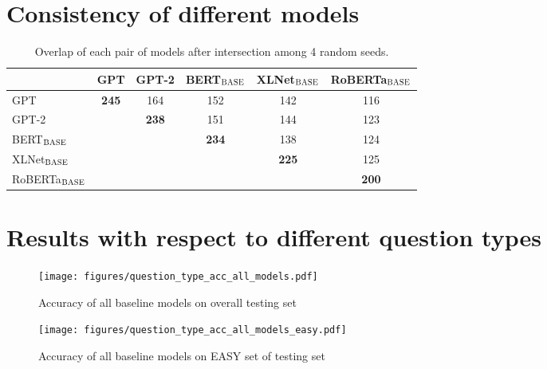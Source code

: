 \documentclass{article} \usepackage{iclr2020_conference,times}
\newcommand\bertbase{BERT$_{\small \textsc{BASE}}$\xspace}
\newcommand\xlnetbase{XLNet$_{\small \textsc{BASE}}$\xspace}
\newcommand\robertabase{RoBERTa$_{\small \textsc{BASE}}$\xspace}
\begin{document}
\section{Consistency of different models}
\label{appendix-consistency-of-different-models}
\begin{table}[ht]
	\small
	\caption{Overlap of each pair of models after intersection among 4 random seeds.}
	\label{tab:Overlap}
	\begin{center}
		\begin{tabular}{l|ccccc}
			 & \multicolumn{1}{c}{GPT}  &\multicolumn{1}{c}{GPT-2} &\multicolumn{1}{c}{\bertbase} &\multicolumn{1}{c}{\xlnetbase} &\multicolumn{1}{c}{\robertabase}\\
			\hline
			GPT &           \bf 245 & 164       & 152       & 142       & 116\\
			GPT-2 &                 & \bf 238   & 151       & 144       & 123\\
			\bertbase &             &           & \bf 234   & 138       & 124 \\
			\xlnetbase &            &           &           & \bf 225   & 125\\
			\robertabase &          &           &           &           & \bf 200\\

		\end{tabular}
	\end{center}
\end{table}
\newpage
\section{Results with respect to different question types}
\label{appendix-results-with-respect-to-different-question-types}
	\begin{figure}[ht]
		\begin{center}
\texttt{[image: figures/question\_type\_acc\_all\_models.pdf]}
		\end{center}
		\caption{Accuracy of all baseline models on overall testing set}
		\label{fig:question_type_acc_all_models}
	\end{figure}
	
	\begin{figure}[htbp]
		\begin{center}
\texttt{[image: figures/question\_type\_acc\_all\_models\_easy.pdf]}
		\end{center}
		\caption{Accuracy of all baseline models on EASY set of testing set}
		\label{fig:question_type_acc_all_models_easy}
	\end{figure}
	
\end{document}

